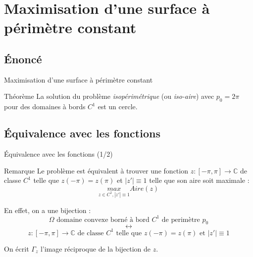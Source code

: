 \documentclass[11pt,envcountsect,aspectratio=169]{beamer} %
\begin{document}
\section{Maximisation d'une surface à périmètre constant}


\subsection{Énoncé}

\begin{frame}{Maximisation d'une surface à périmètre constant}

\begin{beamerboxesrounded}[upper=titreB,lower=texteB,shadow=true]{Théorème}
        La solution du problème \emph{isopérimétrique} (ou \emph{iso-aire}) avec $p_0=2\pi$ pour des domaines à bords $C^1$ est un cercle.
\end{beamerboxesrounded}

\end{frame}


\subsection{Équivalence avec les fonctions}

\begin{frame}{Équivalence avec les fonctions (1/2)}

\begin{beamerboxesrounded}[upper=titreV,lower=texteV,shadow=true]{Remarque}
    Le problème est équivalent à trouver une fonction $z: [-\pi,\pi] \rightarrow \mathbb{C}$ de classe $C^1$ telle que $z(-\pi)=z(\pi)$ et $|z'| \equiv 1$ telle que son aire soit maximale :
    \[ \underset{z \in C^1, |z'|\equiv 1}{max} Aire(z) \]
\end{beamerboxesrounded}

    En effet, on a une bijection :
    \[ \Omega \text{ domaine convexe borné à bord $C^1$ de perimètre $p_0$} \]
    \[ \longleftrightarrow \]
    \[ z: [-\pi,\pi] \rightarrow \mathbb{C} \text{ de classe $C^1$ telle que $z(-\pi)=z(\pi)$ et $|z'| \equiv 1$} \]
    
    On écrit $\Gamma_z$ l'image réciproque de la bijection de $z$.

\end{frame}
\end{document}

